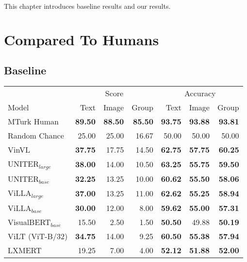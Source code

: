 This chapter introduces baseline results and our results.

\section{Compared To Humans}

\subsection{Baseline}

\begin{table}[ht]
\centering
\begin{tabular}{l|rrr|rrr}
\toprule
 &
  \multicolumn{3}{c|}{{Score}} &
  \multicolumn{3}{c}{{Accuracy}} \\
 Model                               & Text           & Image          & Group          & Text       & Image      & Group      \\
\midrule
 MTurk Human                         & \textbf{89.50} & \textbf{88.50} & \textbf{85.50} & \textbf{93.75} & \textbf{93.88} & \textbf{93.81} \\
 Random Chance                       & 25.00          & 25.00          & 16.67          & 50.00          & 50.00          & 50.00          \\
 \midrule
 VinVL                        & \textbf{37.75} & 17.75          & 14.50          & \textbf{62.75} & \textbf{57.75} & \textbf{60.25} \\
 UNITER$_{large}$             & \textbf{38.00} & 14.00          & 10.50          & \textbf{63.25} & \textbf{55.75} & \textbf{59.50} \\
 UNITER$_{base}$              & \textbf{32.25} & 13.25          & 10.00          & \textbf{60.62} & \textbf{55.50} & \textbf{58.06} \\
 ViLLA$_{large}$              & \textbf{37.00} & 13.25          & 11.00          & \textbf{62.62} & \textbf{55.25} & \textbf{58.94} \\
 ViLLA$_{base}$               & \textbf{30.00} & 12.00          & 8.00           & \textbf{59.62} & \textbf{55.00} & \textbf{57.31} \\
 VisualBERT$_{base}$          & 15.50          & 2.50           & 1.50           & \textbf{50.50} & 49.88          & \textbf{50.19} \\
 ViLT (ViT-B/32)              & \textbf{34.75} & 14.00          & 9.25           & \textbf{60.50} & \textbf{55.38} & \textbf{57.94} \\
 LXMERT                       & 19.25          & 7.00           & 4.00           & \textbf{52.12} & \textbf{51.88} & \textbf{52.00} \\

\end{tabular}
\end{table}
